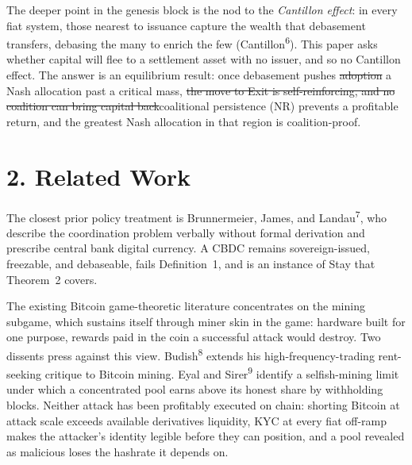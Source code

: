 \documentclass[12pt]{article}
\theoremstyle{definition}
\theoremstyle{remark}
\providecommand{\DIFaddtex}[1]{{\color{AddedText}#1}}
\providecommand{\DIFdeltex}[1]{{\color{DeletedText}\sout{#1}}}
\providecommand{\DIFaddbegin}{}
\providecommand{\DIFaddend}{}
\providecommand{\DIFdelbegin}{}
\providecommand{\DIFdelend}{}
\providecommand{\DIFadd}[1]{\texorpdfstring{\DIFaddtex{#1}}{#1}} %
\providecommand{\DIFdel}[1]{\texorpdfstring{\DIFdeltex{#1}}{}} %
\begin{document}
The deeper point in the genesis block is the nod to the \emph{Cantillon effect}: in every fiat system, those nearest to issuance capture the wealth that debasement transfers, debasing the many to enrich the few (Cantillon\textsuperscript{6}). This paper asks whether capital will flee to a settlement asset with no issuer, and so no Cantillon effect. The answer is an equilibrium result: once debasement pushes \DIFdelbegin \DIFdel{adoption }\DIFdelend \DIFaddbegin \DIFadd{a Nash allocation }\DIFaddend past a critical mass, \DIFdelbegin \DIFdel{the move to Exit is self-reinforcing, and no coalition can bring capital back}\DIFdelend \DIFaddbegin \DIFadd{coalitional persistence (NR) prevents a profitable return, and the greatest Nash allocation in that region is coalition-proof}\DIFaddend .

\newpage


\section{2. Related Work}

The closest prior policy treatment is
Brunnermeier, James, and Landau\textsuperscript{7}, who describe the
coordination problem verbally without formal derivation and prescribe
central bank digital currency. A CBDC remains sovereign-issued,
freezable, and debaseable, fails Definition~1, and is an instance of
Stay that Theorem~2 covers.

The existing Bitcoin game-theoretic literature concentrates on the mining subgame, which sustains itself through miner skin in the game: hardware built for one purpose, rewards paid in the coin a successful attack would destroy. Two dissents press against this view. Budish\textsuperscript{8} extends his high-frequency-trading rent-seeking critique to Bitcoin mining. Eyal and Sirer\textsuperscript{9} identify a selfish-mining limit under which a concentrated pool earns above its honest share by withholding blocks. Neither attack has been profitably executed on chain: shorting Bitcoin at attack scale exceeds available derivatives liquidity, KYC at every fiat off-ramp makes the attacker's identity legible before they can position, and a pool revealed as malicious loses the hashrate it depends on.
\end{document}
